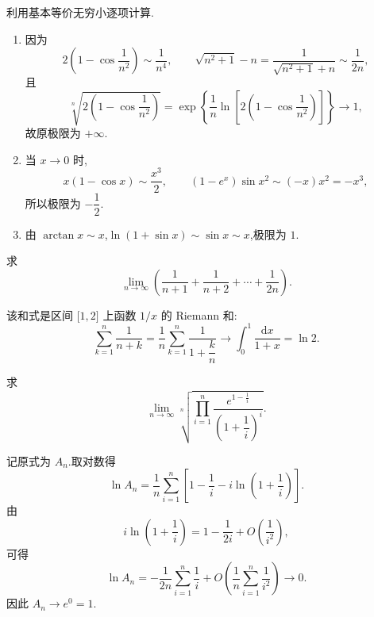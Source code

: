 \begin{solution}
    利用基本等价无穷小逐项计算.
    \begin{enumerate}
        \item 因为
              \[
                  2\left(1-\cos\dfrac{1}{n^2}\right)\sim\dfrac{1}{n^4},
                  \qquad
                  \sqrt{n^2+1}-n
                  =\dfrac{1}{\sqrt{n^2+1}+n}\sim\dfrac{1}{2n},
              \]
              且
              \[
                  \sqrt[n]{2\left(1-\cos\dfrac{1}{n^2}\right)}
                  =\exp\left\{\dfrac{1}{n}\ln\left[2\left(1-\cos\dfrac{1}{n^2}\right)\right]\right\}
                  \longrightarrow 1,
              \]
              故原极限为 $+\infty$.
        \item 当 $x\to0$ 时,
              \[
                  x(1-\cos x)\sim\dfrac{x^3}{2},
                  \qquad
                  (1-e^x)\sin x^2\sim(-x)x^2=-x^3,
              \]
              所以极限为 $-\dfrac{1}{2}$.
        \item 由 $\arctan x\sim x$,$\ln(1+\sin x)\sim\sin x\sim x$,极限为 $1$.
    \end{enumerate}
\end{solution}

\begin{example}
    求
    \[
        \lim\limits_{n\to\infty}
        \left(\dfrac{1}{n+1}+\dfrac{1}{n+2}+\cdots+\dfrac{1}{2n}\right).
    \]
\end{example}
\exampleblank

\begin{solution}
    该和式是区间 $\lbrack 1,2\rbrack$ 上函数 $1/x$ 的 Riemann 和:
    \[
        \sum\limits_{k=1}^{n}\dfrac{1}{n+k}
        =\dfrac{1}{n}\sum\limits_{k=1}^{n}\dfrac{1}{1+\dfrac{k}{n}}
        \longrightarrow\int_0^1\dfrac{\mathrm{d}x}{1+x}
        =\ln2.
    \]
\end{solution}

\begin{example}
    求
    \[
        \lim\limits_{n\to\infty}
        \sqrt[n]{
            \prod\limits_{i=1}^{n}
            \dfrac{e^{1-\frac{1}{i}}}{\left(1+\dfrac{1}{i}\right)^i}
        }.
    \]
\end{example}
\exampleblank

\begin{solution}
    记原式为 $A_n$.取对数得
    \[
        \ln A_n
        =\dfrac{1}{n}\sum\limits_{i=1}^{n}
        \left[1-\dfrac{1}{i}-i\ln\left(1+\dfrac{1}{i}\right)\right].
    \]
    由
    \[
        i\ln\left(1+\dfrac{1}{i}\right)
        =1-\dfrac{1}{2i}+O\left(\dfrac{1}{i^2}\right),
    \]
    可得
    \[
        \ln A_n
        =-\dfrac{1}{2n}\sum\limits_{i=1}^{n}\dfrac{1}{i}
        +O\left(\dfrac{1}{n}\sum\limits_{i=1}^{n}\dfrac{1}{i^2}\right)
        \longrightarrow0.
    \]
    因此 $A_n\to e^0=1$.
\end{solution}

